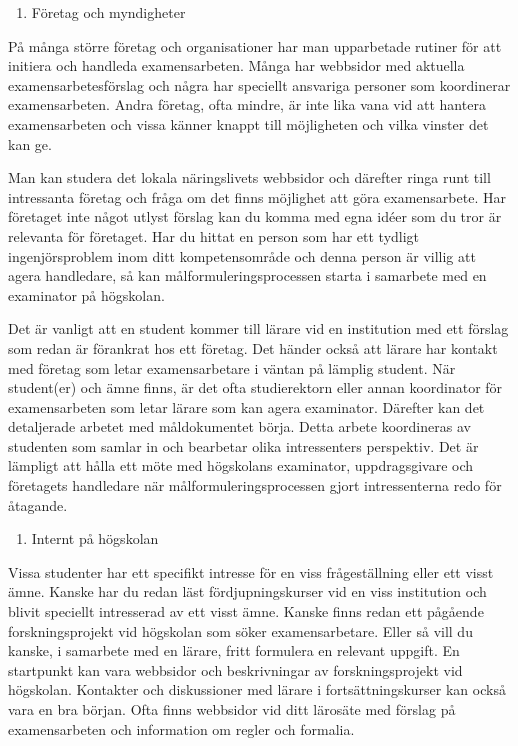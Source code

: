 \begin{enumerate}
\def\labelenumi{\arabic{enumi}.}
\item
  Företag och myndigheter
\end{enumerate}

På många större företag och organisationer har man upparbetade rutiner
för att initiera och handleda examensarbeten. Många har webbsidor med
aktuella examensarbetesförslag och några har speciellt ansvariga
personer som koordinerar examensarbeten. Andra företag, ofta mindre, är
inte lika vana vid att hantera examensarbeten och vissa känner knappt
till möjligheten och vilka vinster det kan ge.

Man kan studera det lokala näringslivets webbsidor och därefter ringa
runt till intressanta företag och fråga om det finns möjlighet att göra
examensarbete. Har företaget inte något utlyst förslag kan du komma med
egna idéer som du tror är relevanta för företaget. Har du hittat en
person som har ett tydligt ingenjörsproblem inom ditt kompetensområde
och denna person är villig att agera handledare, så kan
målformuleringsprocessen starta i samarbete med en examinator på
högskolan.

Det är vanligt att en student kommer till lärare vid en institution med
ett förslag som redan är förankrat hos ett företag. Det händer också att
lärare har kontakt med företag som letar examensarbetare i väntan på
lämplig student. När student(er) och ämne finns, är det ofta
studierektorn eller annan koordinator för examensarbeten som letar
lärare som kan agera examinator. Därefter kan det detaljerade arbetet
med måldokumentet börja. Detta arbete koordineras av studenten som
samlar in och bearbetar olika intressenters perspektiv. Det är lämpligt
att hålla ett möte med högskolans examinator, uppdragsgivare och
företagets handledare när målformuleringsprocessen gjort intressenterna
redo för åtagande.

\begin{enumerate}
\def\labelenumi{\arabic{enumi}.}
\item
  Internt på högskolan
\end{enumerate}

Vissa studenter har ett specifikt intresse för en viss frågeställning
eller ett visst ämne. Kanske har du redan läst fördjupningskurser vid en
viss institution och blivit speciellt intresserad av ett visst ämne.
Kanske finns redan ett pågående forskningsprojekt vid högskolan som
söker examensarbetare. Eller så vill du kanske, i samarbete med en
lärare, fritt formulera en relevant uppgift. En startpunkt kan vara
webbsidor och beskrivningar av forskningsprojekt vid högskolan.
Kontakter och diskussioner med lärare i fortsättningskurser kan också
vara en bra början. Ofta finns webbsidor vid ditt lärosäte med förslag
på examensarbeten och information om regler och formalia.

